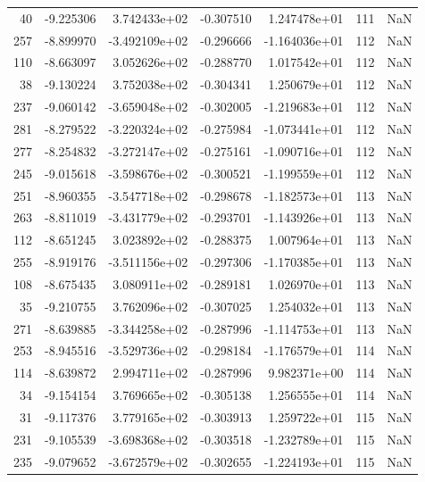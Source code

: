 \begin{tabular}{rrrrrrr}
  40 &  -9.225306 &  3.742433e+02 & -0.307510 &  1.247478e+01 &         111 & NaN \\
 257 &  -8.899970 & -3.492109e+02 & -0.296666 & -1.164036e+01 &         112 & NaN \\
 110 &  -8.663097 &  3.052626e+02 & -0.288770 &  1.017542e+01 &         112 & NaN \\
  38 &  -9.130224 &  3.752038e+02 & -0.304341 &  1.250679e+01 &         112 & NaN \\
 237 &  -9.060142 & -3.659048e+02 & -0.302005 & -1.219683e+01 &         112 & NaN \\
 281 &  -8.279522 & -3.220324e+02 & -0.275984 & -1.073441e+01 &         112 & NaN \\
 277 &  -8.254832 & -3.272147e+02 & -0.275161 & -1.090716e+01 &         112 & NaN \\
 245 &  -9.015618 & -3.598676e+02 & -0.300521 & -1.199559e+01 &         112 & NaN \\
 251 &  -8.960355 & -3.547718e+02 & -0.298678 & -1.182573e+01 &         113 & NaN \\
 263 &  -8.811019 & -3.431779e+02 & -0.293701 & -1.143926e+01 &         113 & NaN \\
 112 &  -8.651245 &  3.023892e+02 & -0.288375 &  1.007964e+01 &         113 & NaN \\
 255 &  -8.919176 & -3.511156e+02 & -0.297306 & -1.170385e+01 &         113 & NaN \\
 108 &  -8.675435 &  3.080911e+02 & -0.289181 &  1.026970e+01 &         113 & NaN \\
  35 &  -9.210755 &  3.762096e+02 & -0.307025 &  1.254032e+01 &         113 & NaN \\
 271 &  -8.639885 & -3.344258e+02 & -0.287996 & -1.114753e+01 &         113 & NaN \\
 253 &  -8.945516 & -3.529736e+02 & -0.298184 & -1.176579e+01 &         114 & NaN \\
 114 &  -8.639872 &  2.994711e+02 & -0.287996 &  9.982371e+00 &         114 & NaN \\
  34 &  -9.154154 &  3.769665e+02 & -0.305138 &  1.256555e+01 &         114 & NaN \\
  31 &  -9.117376 &  3.779165e+02 & -0.303913 &  1.259722e+01 &         115 & NaN \\
 231 &  -9.105539 & -3.698368e+02 & -0.303518 & -1.232789e+01 &         115 & NaN \\
 235 &  -9.079652 & -3.672579e+02 & -0.302655 & -1.224193e+01 &         115 & NaN \\

\end{tabular}
